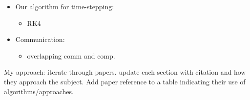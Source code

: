 \begin{itemize}
\item Our algorithm for time-stepping: 
\begin{itemize} 
\item RK4
\end{itemize}


\item Communication: 
\begin{itemize} 
\item overlapping comm and comp. 
\end{itemize}

\end{itemize} 


My approach: 
iterate through papers. update each section with citation and how they approach the subject. Add paper reference to a table indicating their use of algorithms/approaches. 